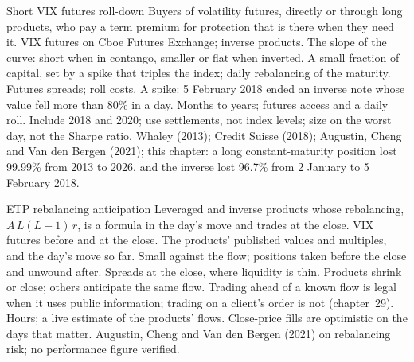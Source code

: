 \begin{strategyfile}{Short VIX futures roll-down}\label{strat:s2:the-volatility-index-complex:rolldown}
 Buyers of volatility futures, directly or through long products, who pay a term premium for protection that is
there when they need it.
 VIX futures on Cboe Futures Exchange; inverse products.
 The slope of the curve: short when in contango, smaller or flat when inverted.
 A small fraction of capital, set by a spike that triples the index; daily rebalancing of the maturity.
 Futures spreads; roll costs.
 A spike: 5 February 2018 ended an inverse note whose value fell more than 80\% in a day.
 Months to years; futures access and a daily roll.
 Include 2018 and 2020; use settlements, not index levels; size on the worst day, not the Sharpe ratio.
 Whaley (2013); Credit Suisse (2018); Augustin, Cheng and Van den Bergen (2021); this chapter: a long constant-maturity position
lost 99.99\% from 2013 to 2026, and the inverse lost 96.7\% from 2 January to 5 February 2018.
\end{strategyfile}

\begin{strategyfile}{ETP rebalancing anticipation}\label{strat:s2:the-volatility-index-complex:flow}
 Leveraged and inverse products whose rebalancing, $A\,L(L - 1)\,r$, is a formula in the day's move and trades at the
close.
 VIX futures before and at the close.
 The products' published values and multiples, and the day's move so far.
 Small against the flow; positions taken before the close and unwound after.
 Spreads at the close, where liquidity is thin.
 Products shrink or close; others anticipate the same flow. Trading ahead of a known flow is legal when it uses public
information; trading on a client's order is not (chapter~29).
 Hours; a live estimate of the products' flows.
 Close-price fills are optimistic on the days that matter.
 Augustin, Cheng and Van den Bergen (2021) on rebalancing risk; no performance figure verified.
\end{strategyfile}

